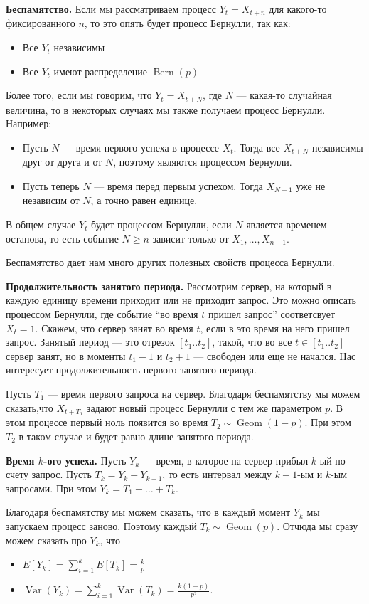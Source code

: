 \documentclass[12pt]{article}
\DeclareMathOperator{\Geom}{Geom}
\DeclareMathOperator{\Bern}{Bern}
\DeclareMathOperator{\Var}{Var}
\begin{document}
\textbf{Беспамятство.} Если мы рассматриваем процесс $Y_t = X_{t + n}$ для какого-то фиксированного $n$, то это опять будет процесс Бернулли, так как:
\begin{itemize}
  \item Все $Y_t$ независимы
  \item Все $Y_t$ имеют распределение $\Bern(p)$
\end{itemize}

Более того, если мы говорим, что $Y_t = X_{t + N}$, где $N$ --- какая-то случайная величина, то в некоторых случаях мы также получаем процесс Бернулли. Например:
\begin{itemize}
  \item Пусть $N$ --- время первого успеха в процессе $X_t$. Тогда все $X_{t + N}$ независимы друг от друга и от $N$, поэтому являются процессом Бернулли.
  \item Пусть теперь $N$ --- время перед первым успехом. Тогда $X_{N + 1}$ уже не независим от $N$, а точно равен единице. 
\end{itemize}
В общем случае $Y_t$ будет процессом Бернулли, если $N$ является временем останова, то есть событие $N \ge n$ зависит только от $X_1, \dots, X_{n - 1}$.

Беспамятство дает нам много других полезных свойств процесса Бернулли.

\textbf{Продолжительность занятого периода.} Рассмотрим сервер, на который в каждую единицу времени приходит или не приходит запрос. Это можно описать процессом Бернулли, где событие ``во время $t$ пришел запрос'' соответсвует $X_t = 1$. Скажем, что сервер занят во время $t$, если в это время на него пришел запрос. Занятый период --- это отрезок $[t_1..t_2]$, такой, что во все $t \in [t_1..t_2]$ сервер занят, но в моменты $t_1 - 1$ и $t_2 + 1$ --- свободен или еще не начался. Нас интересует продолжительность первого занятого периода.

Пусть $T_1$ --- время первого запроса на сервер. Благодаря беспамятству мы можем сказать,что $X_{t + T_1}$ задают новый процесс Бернулли с тем же параметром $p$. В этом процессе первый ноль появится во время $T_2 \sim \Geom(1 - p)$. При этом $T_2$ в таком случае и будет равно длине занятого периода.

\textbf{Время $k$-ого успеха.} Пусть $Y_k$ --- время, в которое на сервер прибыл $k$-ый по счету запрос. Пусть $T_k = Y_k - Y_{k - 1}$, то есть интервал между $k-1$-ым и $k$-ым запросами. При этом $Y_k = T_1 + \dots + T_k$.

Благодаря беспамятству мы можем сказать, что в каждый момент $Y_k$ мы запускаем процесс заново. Поэтому каждый $T_k \sim \Geom(p)$. Отчюда мы сразу можем сказать про $Y_k$, что
\begin{itemize}
  \item $E[Y_k] = \sum_{i = 1}^k E[T_k] = \frac{k}{p}$
  \item $\Var(Y_k) = \sum_{i = 1}^k \Var(T_k) = \frac{k(1 - p)}{p^2}$.
\end{itemize}
\end{document}

